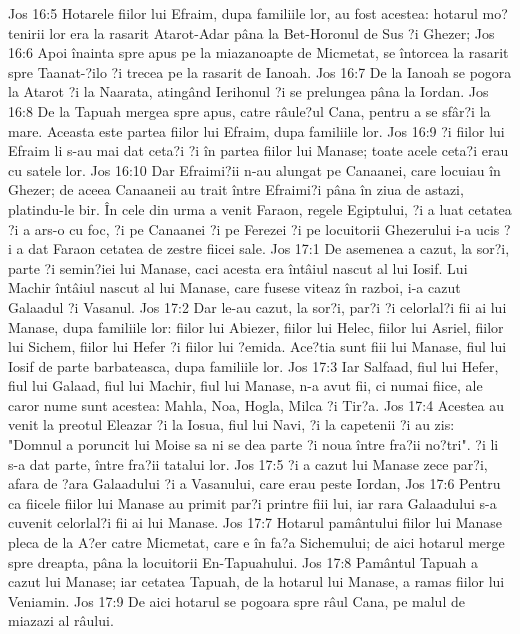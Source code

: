 Jos 16:5  Hotarele fiilor lui Efraim, dupa familiile lor, au fost acestea: hotarul mo?tenirii lor era la rasarit Atarot-Adar pâna la Bet-Horonul de Sus ?i Ghezer;
Jos 16:6  Apoi înainta spre apus pe la miazanoapte de Micmetat, se întorcea la rasarit spre Taanat-?ilo ?i trecea pe la rasarit de Ianoah.
Jos 16:7  De la Ianoah se pogora la Atarot ?i la Naarata, atingând Ierihonul ?i se prelungea pâna la Iordan.
Jos 16:8  De la Tapuah mergea spre apus, catre râule?ul Cana, pentru a se sfâr?i la mare. Aceasta este partea fiilor lui Efraim, dupa familiile lor.
Jos 16:9  ?i fiilor lui Efraim li s-au mai dat ceta?i ?i în partea fiilor lui Manase; toate acele ceta?i erau cu satele lor.
Jos 16:10  Dar Efraimi?ii n-au alungat pe Canaanei, care locuiau în Ghezer; de aceea Canaaneii au trait între Efraimi?i pâna în ziua de astazi, platindu-le bir. În cele din urma a venit Faraon, regele Egiptului, ?i a luat cetatea ?i a ars-o cu foc, ?i pe Canaanei ?i pe Ferezei ?i pe locuitorii Ghezerului i-a ucis ?i a dat Faraon cetatea de zestre fiicei sale.
Jos 17:1  De asemenea a cazut, la sor?i, parte ?i semin?iei lui Manase, caci acesta era întâiul nascut al lui Iosif. Lui Machir întâiul nascut al lui Manase, care fusese viteaz în razboi, i-a cazut Galaadul ?i Vasanul.
Jos 17:2  Dar le-au cazut, la sor?i, par?i ?i celorlal?i fii ai lui Manase, dupa familiile lor: fiilor lui Abiezer, fiilor lui Helec, fiilor lui Asriel, fiilor lui Sichem, fiilor lui Hefer ?i fiilor lui ?emida. Ace?tia sunt fiii lui Manase, fiul lui Iosif de parte barbateasca, dupa familiile lor.
Jos 17:3  Iar Salfaad, fiul lui Hefer, fiul lui Galaad, fiul lui Machir, fiul lui Manase, n-a avut fii, ci numai fiice, ale caror nume sunt acestea: Mahla, Noa, Hogla, Milca ?i Tir?a.
Jos 17:4  Acestea au venit la preotul Eleazar ?i la Iosua, fiul lui Navi, ?i la capetenii ?i au zis: "Domnul a poruncit lui Moise sa ni se dea parte ?i noua între fra?ii no?tri". ?i li s-a dat parte, între fra?ii tatalui lor.
Jos 17:5  ?i a cazut lui Manase zece par?i, afara de ?ara Galaadului ?i a Vasanului, care erau peste Iordan,
Jos 17:6  Pentru ca fiicele fiilor lui Manase au primit par?i printre fiii lui, iar rara Galaadului s-a cuvenit celorlal?i fii ai lui Manase.
Jos 17:7  Hotarul pamântului fiilor lui Manase pleca de la A?er catre Micmetat, care e în fa?a Sichemului; de aici hotarul merge spre dreapta, pâna la locuitorii En-Tapuahului.
Jos 17:8  Pamântul Tapuah a cazut lui Manase; iar cetatea Tapuah, de la hotarul lui Manase, a ramas fiilor lui Veniamin.
Jos 17:9  De aici hotarul se pogoara spre râul Cana, pe malul de miazazi al râului.
